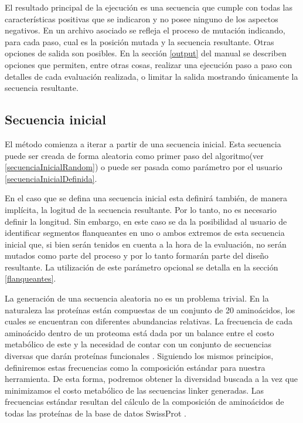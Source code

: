 El resultado principal de la ejecución es una secuencia que cumple con todas las características positivas que se indicaron y no posee ninguno de los aspectos negativos.
En un archivo asociado se refleja el proceso de mutación indicando, para cada paso, cual es la posición mutada y la secuencia resultante.
Otras opciones de salida son posibles. En la sección \ref{output} del manual se describen opciones que permiten, entre otras cosas, realizar una ejecución paso a paso con detalles de cada evaluación realizada, 
o limitar la salida mostrando únicamente la secuencia resultante.

\subsection{Secuencia inicial}\label{seqInicial}

El método comienza a iterar a partir de una secuencia inicial. 
Esta secuencia puede ser creada de forma aleatoria como primer paso del 
algoritmo(ver \ref{secuenciaInicialRandom}) o puede ser pasada como parámetro por el usuario \ref{secuenciaInicialDefinida}. 

En el caso que se defina una secuencia inicial esta definirá también, de manera implícita, la logitud de la secuencia resultante. Por lo tanto, no es necesario definir la longitud.
Sin embargo, en este caso se da la posibilidad al usuario de identificar segmentos flanqueantes en uno o ambos extremos de esta secuencia inicial que, si bien serán tenidos en cuenta a la hora de la evaluación,
no serán mutados como parte del proceso y por lo tanto formarán parte del diseño resultante. 
La utilización de este parámetro opcional se detalla en la sección \ref{flanqueantes}.



La generación de una secuencia aleatoria no es un problema trivial. 
En la naturaleza las proteínas están compuestas de un conjunto de 20 aminoácidos, los cuales se encuentran con diferentes abundancias relativas. 
La frecuencia de cada aminoácido dentro de un proteoma está dada por un balance entre el costo metabólico de este y la necesidad de contar con un conjunto de secuencias diversas que darán proteínas funcionales \cite{krick2014amino}. 
Siguiendo los mismos principios, definiremos estas frecuencias como la composición estándar para nuestra herramienta. 
De esta forma, podremos obtener la diversidad buscada a la vez que minimizamos el costo metabólico de las secuencias linker generadas.
Las frecuencias estándar resultan del cálculo de la composición de aminoácidos de todas las proteínas de la base de datos SwissProt \cite{compositionAA}.  

